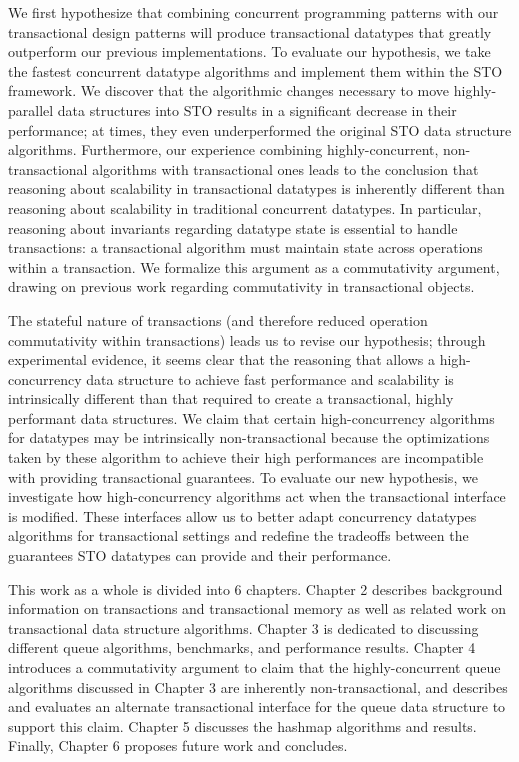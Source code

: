 We first hypothesize that combining concurrent programming patterns with our transactional design patterns will produce transactional datatypes that greatly outperform our previous implementations. To evaluate our hypothesis, we take the fastest concurrent datatype algorithms and implement them within the STO framework. We discover that the algorithmic changes necessary to move highly-parallel data structures into STO results in a significant decrease in their performance; at times, they even underperformed the original STO data structure algorithms. Furthermore, our experience combining highly-concurrent, non-transactional algorithms with transactional ones leads to the conclusion that reasoning about scalability in transactional datatypes is inherently different than reasoning about scalability in traditional concurrent datatypes. In particular, reasoning about invariants regarding datatype state is essential to handle transactions: a transactional algorithm must maintain state across operations within a transaction. We formalize this argument as a commutativity argument, drawing on previous work regarding commutativity in transactional objects\cite{weihl}.

The stateful nature of transactions (and therefore reduced operation commutativity within transactions) leads us to revise our hypothesis; through experimental evidence, it seems clear that the reasoning that allows a high-concurrency data structure to achieve fast performance and scalability is intrinsically different than that required to create a transactional, highly performant data structures. We claim that certain high-concurrency algorithms for datatypes may be intrinsically non-transactional because the optimizations taken by these algorithm to achieve their high performances are incompatible with providing transactional guarantees. To evaluate our new hypothesis, we investigate how high-concurrency algorithms act when the transactional interface is modified. These interfaces allow us to better adapt concurrency datatypes algorithms for transactional settings and redefine the tradeoffs between the guarantees STO datatypes can provide and their performance.

This work as a whole is divided into 6 chapters. Chapter 2 describes background information on transactions and transactional memory as well as related work on transactional data structure algorithms. Chapter 3 is dedicated to discussing different queue algorithms, benchmarks, and performance results. Chapter 4 introduces a commutativity argument to claim that the highly-concurrent queue algorithms discussed in Chapter 3 are inherently non-transactional, and describes and evaluates an alternate transactional interface for the queue data structure to support this claim. Chapter 5 discusses the hashmap algorithms and results. Finally, Chapter 6 proposes future work and concludes.
